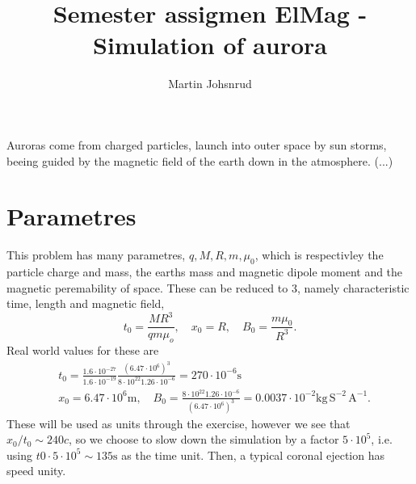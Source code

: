 \documentclass{article}
\title{Semester assigmen ElMag - Simulation of aurora}
\author{Martin Johsnrud}
\begin{document}
    \maketitle

    Auroras come from charged particles, launch into outer space by sun storms, beeing guided by the magnetic field of the earth down in the atmosphere. (...) 
    
    \section*{Parametres}
    This problem has many parametres, $q, M, R, m, \mu_0$, which is respectivley the particle charge and mass, the earths mass and magnetic dipole moment and the magnetic peremability of space. These can be reduced to 3, namely characteristic time, length and magnetic field,
    \begin{equation*}
        t_0 = \frac{M R^3}{q m \mu_o}, \quad x_0 = R, \quad B_0 = \frac{m \mu_0}{R^3}.
    \end{equation*}
    Real world values for these are  
    \begin{align*}
        & t_0 = \frac{1.6 \cdot 10^{-27}}{1.6\cdot10^{-19}}\frac{(6.47 \cdot 10^6)^3 }{8 \cdot 10^{22} 1.26 \cdot 10^{-6} } = 270 \cdot 10^{-6} \textrm{s}\\
        & x_0 = 6.47 \cdot 10^6 \textrm{m}, \quad
        B_0 = \frac{8 \cdot 10^{22} 1.26 \cdot 10^{-6}}{(6.47 \cdot 10^6)^3} = 0.0037 \cdot 10^{-2} \textrm{kg} \, \textrm{S}^{-2} \, \textrm{A}^{-1}.
    \end{align*}
    These will be used as units through the exercise, however we see that $x_0 / t_0 \sim 240 c$, so we choose to slow down the simulation by a factor $ 5\cdot 10^5$, i.e. using $t0 \cdot 5\cdot 10^5 \sim 135 \textrm{s}$ as the time unit. Then, a typical coronal ejection has speed unity.
    
\end{document}
